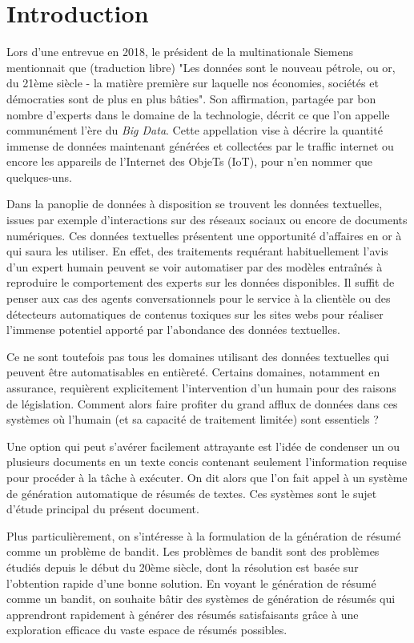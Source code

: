 \chapter*{Introduction}
\label{chap:introduction}

Lors d'une entrevue en 2018, le président de la multinationale Siemens 
mentionnait que (traduction libre) "Les données sont le nouveau pétrole, ou or,
du 21ème siècle - la matière première sur laquelle nos économies,
sociétés et démocraties sont de plus en plus bâties".
Son affirmation, partagée par bon nombre d'experts dans le domaine de la
technologie, décrit ce que l'on appelle communément l'ère du \textit{Big Data}.
Cette appellation vise à décrire la quantité immense de données maintenant 
générées et collectées par le traffic internet ou encore les appareils de 
l'Internet des ObjeTs (IoT), pour n'en nommer que quelques-uns.

Dans la panoplie de données à disposition se trouvent les données textuelles, 
issues par exemple d'interactions sur des réseaux sociaux ou encore de documents 
numériques.
Ces données textuelles présentent une opportunité d'affaires en or à qui saura
les utiliser.
En effet, des traitements requérant habituellement l'avis d'un expert humain 
peuvent se voir automatiser par des modèles entraînés à reproduire le comportement
des experts sur les données disponibles.
Il suffit de penser aux cas des agents conversationnels pour le service à 
la clientèle ou des détecteurs automatiques de contenus toxiques 
sur les sites webs pour réaliser l'immense potentiel apporté par l'abondance
des données textuelles.

Ce ne sont toutefois pas tous les domaines utilisant des données textuelles 
qui peuvent être automatisables en entièreté.
Certains domaines, notamment en assurance, requièrent explicitement l'intervention 
d'un humain pour des raisons de législation.
Comment alors faire profiter du grand afflux de données dans ces systèmes où l'humain (et
sa capacité de traitement limitée) sont essentiels ?

Une option qui peut s'avérer facilement attrayante est l'idée de condenser un ou plusieurs
documents en un texte concis contenant seulement l'information requise pour procéder à la
tâche à exécuter.
On dit alors que l'on fait appel à un système de génération automatique de résumés de textes.
Ces systèmes sont le sujet d'étude principal du présent document.

Plus particulièrement, on s'intéresse à la formulation 
de la génération de résumé comme un problème de bandit.
Les problèmes de bandit sont des problèmes étudiés depuis le début du 20ème
siècle, dont la résolution est basée sur l'obtention rapide d'une bonne solution.
En voyant le génération de résumé comme un bandit, on souhaite bâtir 
des systèmes de génération de résumés qui apprendront rapidement à générer 
des résumés satisfaisants grâce à une exploration efficace du vaste espace de résumés 
possibles. 

